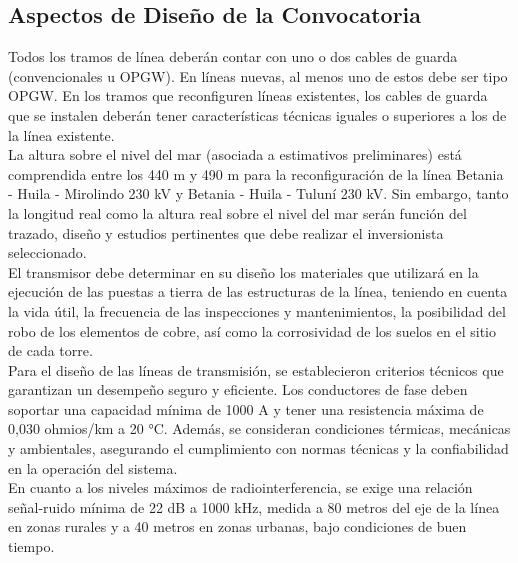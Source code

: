 \subsection*{Aspectos de Diseño de la Convocatoria}
Todos los tramos de línea deberán contar con uno o dos cables de guarda (convencionales u OPGW). En líneas nuevas, al menos uno de estos debe ser tipo OPGW. En los tramos que reconfiguren líneas existentes, los cables de guarda que se instalen deberán tener características técnicas iguales o superiores a los de la línea existente.\\La altura sobre el nivel del mar (asociada a estimativos preliminares) está comprendida entre los 440 m y 490 m para la reconfiguración de la línea Betania - Huila - Mirolindo 230 kV y Betania - Huila - Tuluní 230 kV. Sin embargo, tanto la longitud real como la altura real sobre el nivel del mar serán función del trazado, diseño y estudios pertinentes que debe realizar el inversionista seleccionado.\\El transmisor debe determinar en su diseño los materiales que utilizará en la ejecución de las puestas a tierra de las estructuras de la línea, teniendo en cuenta la vida útil, la frecuencia de las inspecciones y mantenimientos, la posibilidad del robo de los elementos de cobre, así como la corrosividad de los suelos en el sitio de cada torre.\\Para el diseño de las líneas de transmisión, se establecieron criterios técnicos que garantizan un desempeño seguro y eficiente. Los conductores de fase deben soportar una capacidad mínima de 1000 A y tener una resistencia máxima de 0,030 ohmios/km a 20 °C. Además, se consideran condiciones térmicas, mecánicas y ambientales, asegurando el cumplimiento con normas técnicas y la confiabilidad en la operación del sistema.\\En cuanto a los niveles máximos de radiointerferencia, se exige una relación señal-ruido mínima de 22 dB a 1000 kHz, medida a 80 metros del eje de la línea en zonas rurales y a 40 metros en zonas urbanas, bajo condiciones de buen tiempo.


